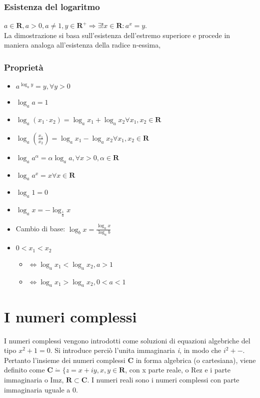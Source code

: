 \subsection{Esistenza del logaritmo}
$a\in \mathbf{R}, a>0, a\neq 1, y\in \mathbf{R^+}\Rightarrow\exists!x\in\mathbf{R}:a^x=y$.\\
La dimostrazione si basa sull'esistenza dell'estremo superiore e procede in maniera analoga all'esistenza della radice n-essima,
\subsection{Propriet\`a}
\begin{itemize}
\item $a^{\log_a y}=y,\forall y>0$
\item $\log_a a =1$
\item $\log_a(x_1\cdot x_2)=\log_a x_1 + \log_a x_2 \forall x_1, x_2 \in \mathbf{R}$
\item $\log_a(\frac{x_1}{x_2})=\log_a x_1 - \log_a x_2 \forall x_1, x_2 \in \mathbf{R}$
\item $\log_a a^{\alpha} =\alpha\log_a a, \forall x>0, \alpha \in \mathbf{R}$
\item $\log_a a^x =x \forall x\in \mathbf{R}$
\item $\log_a 1 =0$
\item $\log_a x =-\log_{\frac{1}{a}} x$
\item Cambio di base: $\log_b x=\frac{\log_a x}{\log_a b}$
\item $0<x_1<x_2$
\begin{itemize}
\item $\Leftrightarrow \log_a x_1<\log_a x_2, a>1$
\item $\Leftrightarrow \log_a x_1>\log_a x_2, 0<a<1$
\end{itemize}
\end{itemize}
\chapter{I numeri complessi}
I numeri complessi vengono introdotti come soluzioni di equazioni algebriche del tipo $x^2+1=0$. Si introduce perci\`o l'unita immaginaria \emph{i}, 
in modo che $i^2+-$. Pertanto l'insieme dei numeri complessi $\mathbf{C}$ in forma algebrica (o cartesiana), viene definito come 
$\mathbf{C}\dot{=}\{z=x+iy, x, y\in\mathbf{R}$, con x parte reale, o Rez e i parte immaginaria o Imz, $\mathbf{R}\subset\mathbf{C}$. I numeri reali sono 
i numeri complessi con parte immaginaria uguale a 0. 
